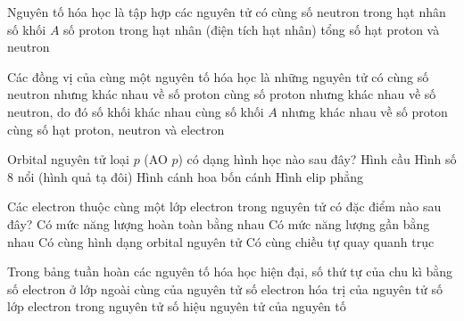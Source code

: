 \begin{ex}
    Nguyên tố hóa học là tập hợp các nguyên tử có cùng
    \choice
    {số neutron trong hạt nhân}
    {số khối $A$}
    {\True số proton trong hạt nhân (điện tích hạt nhân)}
    {tổng số hạt proton và neutron}
\end{ex}

\begin{ex}
    Các đồng vị của cùng một nguyên tố hóa học là những nguyên tử có
    \choice
    {cùng số neutron nhưng khác nhau về số proton}
    {\True cùng số proton nhưng khác nhau về số neutron, do đó số khối khác nhau}
    {cùng số khối $A$ nhưng khác nhau về số proton}
    {cùng số hạt proton, neutron và electron}
\end{ex}

\begin{ex}
    Orbital nguyên tử loại $p$ (AO $p$) có dạng hình học nào sau đây?
    \choice
    {Hình cầu}
    {\True Hình số 8 nổi (hình quả tạ đôi)}
    {Hình cánh hoa bốn cánh}
    {Hình elip phẳng}
\end{ex}

\begin{ex}
    Các electron thuộc cùng một lớp electron trong nguyên tử có đặc điểm nào sau đây?
    \choice
    {Có mức năng lượng hoàn toàn bằng nhau}
    {\True Có mức năng lượng gần bằng nhau}
    {Có cùng hình dạng orbital nguyên tử}
    {Có cùng chiều tự quay quanh trục}
\end{ex}

\begin{ex}
    Trong bảng tuần hoàn các nguyên tố hóa học hiện đại, số thứ tự của chu kì bằng
    \choice
    {số electron ở lớp ngoài cùng của nguyên tử}
    {số electron hóa trị của nguyên tử}
    {\True số lớp electron trong nguyên tử}
    {số hiệu nguyên tử của nguyên tố}
\end{ex}

